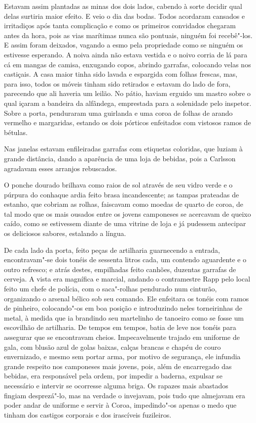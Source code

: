  Estavam assim plantadas as minas dos dois lados, cabendo à sorte decidir qual 
 delas surtiria maior efeito. E veio o dia das bodas. Todos acordaram cansados e
 irritadiços após tanta complicação e como os primeiros convidados chegaram
 antes da hora, pois as vias marítimas nunca são pontuais, ninguém foi 
 recebê"-los. E assim foram deixados, vagando a esmo pela propriedade como se
 ninguém os estivesse esperando. A noiva ainda não estava vestida e o
 noivo corria de lá para cá em mangas de camisa, enxugando copos, abrindo
 garrafas, colocando velas nos castiçais. A casa maior tinha sido lavada e
 espargida com folhas frescas, mas, para isso, todos os móveis tinham sido
 retirados e estavam do lado de fora, parecendo que ali haveria um leilão. No
 pátio, haviam erguido um mastro sobre o qual içaram a bandeira da
 alfândega, emprestada para a solenidade pelo inspetor. Sobre a porta,
 penduraram uma guirlanda e uma coroa de folhas de arando vermelho e
 margaridas, estando os dois pórticos enfeitados com vistosos ramos de bétulas.

 Nas janelas estavam enfileiradas garrafas com etiquetas coloridas, que luziam à
grande distância, dando a aparência de uma loja de bebidas, pois a Carlsson agradavam 
esses arranjos rebuscados.

 O ponche dourado brilhava como raios de sol através de seu vidro verde e o
 púrpura do conhaque ardia feito brasa incandescente; as tampas prateadas de
 estanho, que cobriam as rolhas, faiscavam como moedas de quarto de coroa, de
 tal modo que os mais ousados entre os jovens camponeses se acercavam de queixo
 caído, como se estivessem diante de uma vitrine de loja e já pudessem antecipar os 
deliciosos sabores, estalando a língua.

De cada lado da porta, feito peças de artilharia guarnecendo a entrada,
encontravam"-se dois tonéis de sessenta litros cada, um contendo aguardente e o
outro refresco; e atrás destes, empilhadas feito canhões, duzentas
garrafas de cerveja. A vista era magnífica e marcial, andando o contramestre
Rapp pelo local feito um chefe de polícia, com o saca"-rolhas pendurado num
cinturão, organizando o arsenal bélico sob seu comando. Ele enfeitara os
tonéis com ramos de pinheiro, colocando"-os em boa posição e introduzindo neles
torneirinhas de metal, à medida que ia brandindo seu martelinho de tanoeiro
como se fosse um escovilhão de artilharia. De tempos em tempos, batia de leve 
nos tonéis para assegurar que se encontravam cheios.
Impecavelmente trajado em uniforme de gala, com blusão azul de golas baixas,
calças brancas e chapéu de couro envernizado, e mesmo sem portar arma, por motivo de segurança,
ele infundia grande respeito nos camponeses mais jovens, pois, além de
encarregado das bebidas, era responsável pela ordem, por impedir a baderna, expulsar se
necessário e intervir se ocorresse alguma briga. Os rapazes mais abastados fingiam
desprezá"-lo, mas na verdade o invejavam, pois tudo que almejavam era poder andar
de uniforme e servir à Coroa, impedindo"-os apenas o medo que tinham dos castigos
corporais e dos irascíveis fuzileiros. 

